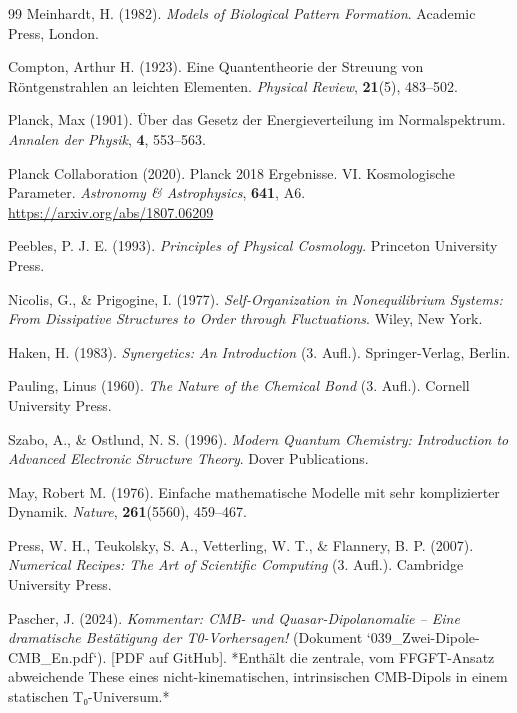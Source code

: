 \begin{thebibliography}{99}
	Meinhardt, H. (1982). \textit{Models of Biological Pattern Formation}. 
	Academic Press, London.
	
	Compton, Arthur H. (1923). Eine Quantentheorie der Streuung von Röntgenstrahlen an leichten Elementen. 
	\textit{Physical Review}, \textbf{21}(5), 483--502.
	
	Planck, Max (1901). Über das Gesetz der Energieverteilung im Normalspektrum. 
	\textit{Annalen der Physik}, \textbf{4}, 553--563.
	
	Planck Collaboration (2020). Planck 2018 Ergebnisse. VI. Kosmologische Parameter. 
	\textit{Astronomy \& Astrophysics}, \textbf{641}, A6.
	\href{https://arxiv.org/abs/1807.06209}{https://arxiv.org/abs/1807.06209}
	
	Peebles, P. J. E. (1993). \textit{Principles of Physical Cosmology}. 
	Princeton University Press.
	
	Nicolis, G., \& Prigogine, I. (1977). \textit{Self-Organization in Nonequilibrium Systems: From Dissipative Structures to Order through Fluctuations}. 
	Wiley, New York.
	
	Haken, H. (1983). \textit{Synergetics: An Introduction} (3. Aufl.). 
	Springer-Verlag, Berlin.
	
	Pauling, Linus (1960). \textit{The Nature of the Chemical Bond} (3. Aufl.). 
	Cornell University Press.
	
	Szabo, A., \& Ostlund, N. S. (1996). \textit{Modern Quantum Chemistry: Introduction to Advanced Electronic Structure Theory}. 
	Dover Publications.
	
	May, Robert M. (1976). Einfache mathematische Modelle mit sehr komplizierter Dynamik. 
	\textit{Nature}, \textbf{261}(5560), 459--467.
	
	Press, W. H., Teukolsky, S. A., Vetterling, W. T., \& Flannery, B. P. (2007). \textit{Numerical Recipes: The Art of Scientific Computing} (3. Aufl.). 
	Cambridge University Press.
	
	Pascher, J. (2024). \textit{Kommentar: CMB- und Quasar-Dipolanomalie – Eine dramatische Bestätigung der T0-Vorhersagen!} (Dokument `039\_Zwei-Dipole-CMB\_En.pdf`).
	[PDF auf GitHub].
	*Enthält die zentrale, vom FFGFT-Ansatz abweichende These eines nicht-kinematischen, intrinsischen CMB-Dipols in einem statischen T₀-Universum.*
	

\end{thebibliography}
